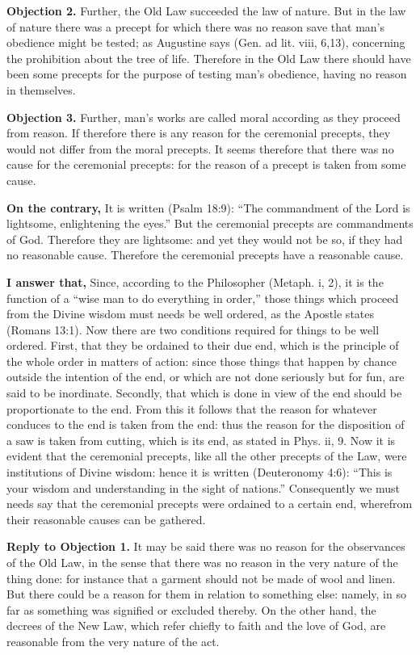 \textbf{Objection 2.} Further, the Old Law succeeded the law of nature. But in the law of nature there was a precept for which there was no reason save that man's obedience might be tested; as Augustine says (Gen. ad lit. viii, 6,13), concerning the prohibition about the tree of life. Therefore in the Old Law there should have been some precepts for the purpose of testing man's obedience, having no reason in themselves.

\textbf{Objection 3.} Further, man's works are called moral according as they proceed from reason. If therefore there is any reason for the ceremonial precepts, they would not differ from the moral precepts. It seems therefore that there was no cause for the ceremonial precepts: for the reason of a precept is taken from some cause.

\textbf{On the contrary,} It is written (Psalm 18:9): ``The commandment of the Lord is lightsome, enlightening the eyes.'' But the ceremonial precepts are commandments of God. Therefore they are lightsome: and yet they would not be so, if they had no reasonable cause. Therefore the ceremonial precepts have a reasonable cause.

\textbf{I answer that,} Since, according to the Philosopher (Metaph. i, 2), it is the function of a ``wise man to do everything in order,'' those things which proceed from the Divine wisdom must needs be well ordered, as the Apostle states (Romans 13:1). Now there are two conditions required for things to be well ordered. First, that they be ordained to their due end, which is the principle of the whole order in matters of action: since those things that happen by chance outside the intention of the end, or which are not done seriously but for fun, are said to be inordinate. Secondly, that which is done in view of the end should be proportionate to the end. From this it follows that the reason for whatever conduces to the end is taken from the end: thus the reason for the disposition of a saw is taken from cutting, which is its end, as stated in Phys. ii, 9. Now it is evident that the ceremonial precepts, like all the other precepts of the Law, were institutions of Divine wisdom: hence it is written (Deuteronomy 4:6): ``This is your wisdom and understanding in the sight of nations.'' Consequently we must needs say that the ceremonial precepts were ordained to a certain end, wherefrom their reasonable causes can be gathered.

\textbf{Reply to Objection 1.} It may be said there was no reason for the observances of the Old Law, in the sense that there was no reason in the very nature of the thing done: for instance that a garment should not be made of wool and linen. But there could be a reason for them in relation to something else: namely, in so far as something was signified or excluded thereby. On the other hand, the decrees of the New Law, which refer chiefly to faith and the love of God, are reasonable from the very nature of the act.


